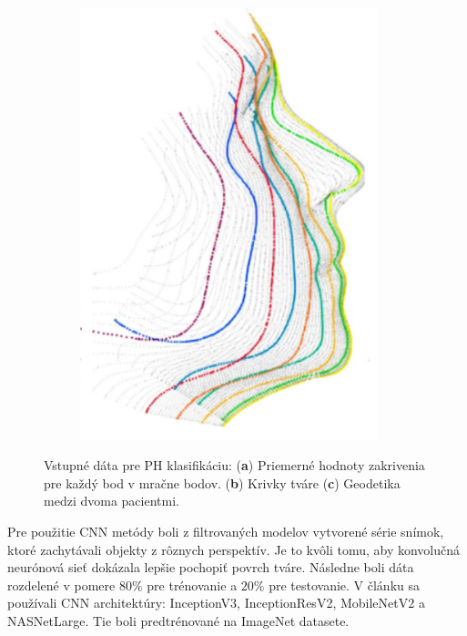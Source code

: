 \begin{figure}[h]
\begin{subfigure}[b]{0.32\textwidth}
		\includegraphics[width=0.95\textwidth]{figures/resers_c.png}
		\caption{}
		\label{fig:resers:c}
	\end{subfigure}
	\caption{Vstupné dáta pre PH klasifikáciu: (\textbf{a}) Priemerné hodnoty zakrivenia pre každý bod v mračne bodov. 
	(\textbf{b}) Krivky tváre
	(\textbf{c}) Geodetika medzi dvoma pacientmi. }
	\label{fig:resers:1}
\end{figure}

\newpage


Pre použitie CNN metódy boli z filtrovaných modelov vytvorené série snímok, ktoré zachytávali objekty z rôznych perspektív. Je to kvôli tomu, aby konvolučná neurónová sieť dokázala lepšie pochopiť povrch tváre. Následne boli dáta rozdelené v pomere $80\%$ pre trénovanie a $20\%$ pre testovanie. V článku sa používali CNN architektúry: InceptionV3, InceptionResV2, MobileNetV2 a NASNetLarge. Tie boli predtrénované na ImageNet datasete. 


